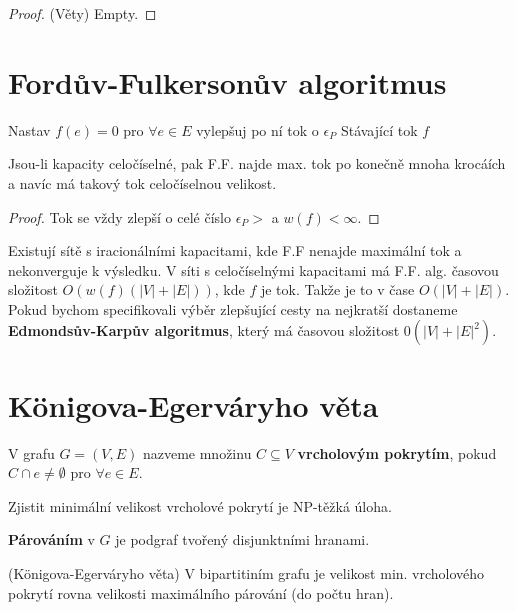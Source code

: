 \begin{proof} (Věty)
	Empty.
\end{proof}

\section{Fordův-Fulkersonův algoritmus}

\begin{algorithmic}[1]
	\State Nastav $f(e) = 0$ pro $\forall e \in E$
	\State  vylepšuj po ní tok o $\epsilon_P$
	\EndWhile \newline
	\Return Stávající tok $f$
\end{algorithmic}

\begin{veta}[o celočíselnosti]
	Jsou-li kapacity celočíselné, pak F.F. najde max. tok po konečně mnoha krocáích a navíc má takový tok celočíselnou velikost.
\end{veta}

\begin{proof}
	Tok se vždy zlepší o celé číslo $\epsilon_P >$ a $w(f) < \infty$.
\end{proof}

Existují sítě s iracionálními kapacitami, kde F.F nenajde maximální tok a nekonverguje k výsledku. V síti s celočíselnými kapacitami má F.F. alg. časovou složitost $O(w(f)(|V|+|E|))$, kde $f$ je tok. Takže je to v čase $O(|V|+|E|)$. Pokud bychom specifikovali výběr zlepšující cesty na nejkratší dostaneme \textbf{Edmondsův-Karpův algoritmus}, který má časovou složitost $0(|V|+|E|^2)$.

\section{Königova-Egerváryho věta}

\begin{definice}
	V grafu $G = (V,E)$ nazveme množinu $C \subseteq V$ \textbf{vrcholovým pokrytím}, pokud $C \cap e \neq \emptyset$ pro $\forall e \in E$.
\end{definice}

Zjistit minimální velikost vrcholové pokrytí je NP-těžká úloha.

\begin{definice}
	\textbf{Párováním} v $G$ je podgraf tvořený disjunktními hranami.
\end{definice}

\begin{veta}(Königova-Egerváryho věta)
	V bipartitiním grafu je velikost min. vrcholového pokrytí rovna velikosti maximálního párování (do počtu hran).
\end{veta}


